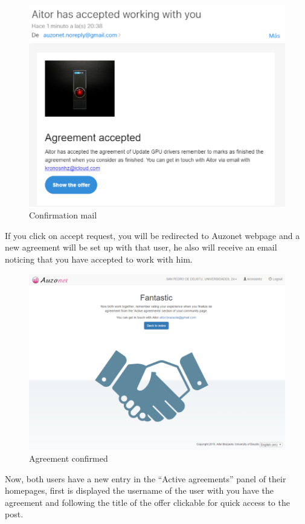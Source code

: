 \documentclass{DeustoFDP}
\begin{document}
\begin{figure}[h!]
\centering
\includegraphics[width=0.9\linewidth]{fig/Manual/confirmationmail}
\caption[Confirmation mail]{Confirmation mail}
\label{fig:confirmationmail}
\end{figure}

If you click on accept request, you will be redirected to Auzonet webpage and a new agreement will be set up with that user, he also will receive an email noticing that you have accepted to work with him.

\begin{figure}[h!]
\centering
\includegraphics[width=0.9\linewidth]{fig/Manual/confirmedagreement}
\caption[Agreement confirmed]{Agreement confirmed}
\label{fig:confirmedagreement}
\end{figure}


Now, both users have a new entry in the “Active agreements” panel of their homepages, first is displayed the username of the user with you have the agreement and following the title of the offer clickable for quick access to the post.
\end{document}
